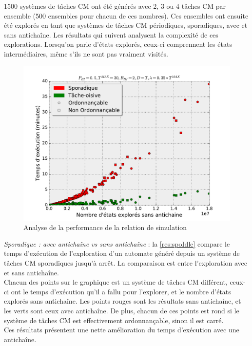 \documentclass[12pt,a4paper,oneside]{book}
\theoremstyle{break}
\theoremstyle{breakplain}
\begin{document}
1500 systèmes de tâches CM ont été générés avec 2, 3 ou 4 tâches CM par ensemble (500 ensembles pour chacun de ces nombres). Ces ensembles ont ensuite été explorés en tant que systèmes de tâches CM périodiques, sporadiques, avec et sans antichaîne. Les résultats qui suivent analysent la complexité de ces explorations. Lorsqu'on parle d'états explorés, ceux-ci comprennent les états intermédiaires, même s'ils ne sont pas vraiment visités.
\begin{figure}[h]
\includegraphics[width=\textwidth]{./results/timeSpoIdle.pdf}
\caption{Analyse de la performance de la relation de simulation}
\label{res:spoIdle}
\end{figure}

\textit{Sporadique : avec antichaîne vs sans antichaîne} : la \autoref{res:spoIdle} compare le temps d'exécution de l'exploration d'un automate généré depuis un système de tâches CM sporadiques jusqu'à arrêt. La comparaison est entre l'exploration avec et sans antichaîne.\\
Chacun des points sur le graphique est un système de tâches CM différent, ceux-ci ont le temps d'exécution qu'il a fallu pour l'explorer, et le nombre d'états explorés sans antichaîne. Les points rouges sont les résultats sans antichaîne, et les verts sont ceux avec antichaîne. De plus, chacun de ces points est rond si le système de tâches CM est effectivement ordonnançable, sinon il est carré.\\
Ces résultats présentent une nette amélioration du temps d'exécution avec une antichaîne.\\
\end{document}
